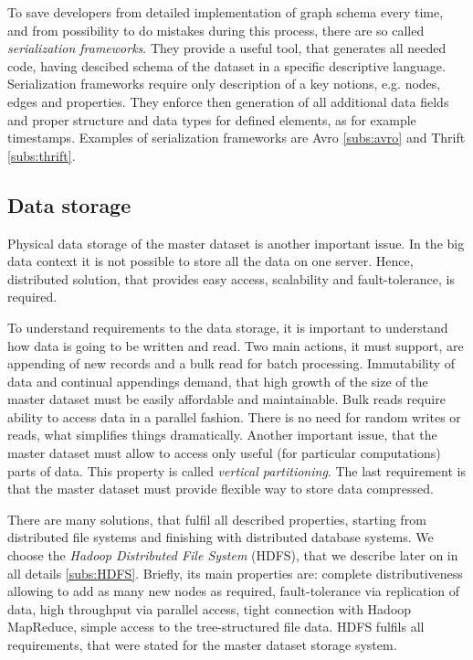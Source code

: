 To save developers from detailed implementation of graph schema every time, and from possibility to do mistakes during this process, there are so called \textit{serialization frameworks}.
They provide a useful tool, that generates all needed code, having descibed schema of the dataset in a specific descriptive language.
Serialization frameworks require only description of a key notions, e.g. nodes, edges and properties.
They enforce then generation of all additional data fields and proper structure and data types for defined elements, as for example timestamps.  
Examples of serialization frameworks are Avro \ref{subs:avro} and Thrift \ref{subs:thrift}.

\subsection{Data storage}

Physical data storage of the master dataset is another important issue.
In the big data context it is not possible to store all the data on one server.
Hence, distributed solution, that provides easy access, scalability and fault-tolerance, is required. 

To understand requirements to the data storage, it is important to understand how data is going to be written and read.
Two main actions, it must support, are appending of new records and a bulk read for batch processing.
Immutability of data and continual appendings demand, that high growth of the size of the master dataset must be easily affordable and maintainable.
Bulk reads require ability to access data in a parallel fashion.
There is no need for random writes or reads, what simplifies things dramatically.
Another important issue, that the master dataset must allow to access only useful (for particular computations) parts of data.
This property is called \textit{vertical partitioning}.
The last requirement is that the master dataset must provide flexible way to store data compressed.

There are many solutions, that fulfil all described properties, starting from distributed file systems and finishing with distributed database systems. 
We choose the \textit{Hadoop Distributed File System} (HDFS), that we describe later on in all details \ref{subs:HDFS}.
Briefly, its main properties are: complete distributiveness allowing to add as many new nodes as required, fault-tolerance via replication of data, high throughput via parallel access, tight connection with Hadoop MapReduce, simple access to the tree-structured file data.
HDFS fulfils all requirements, that were stated for the master dataset storage system.

